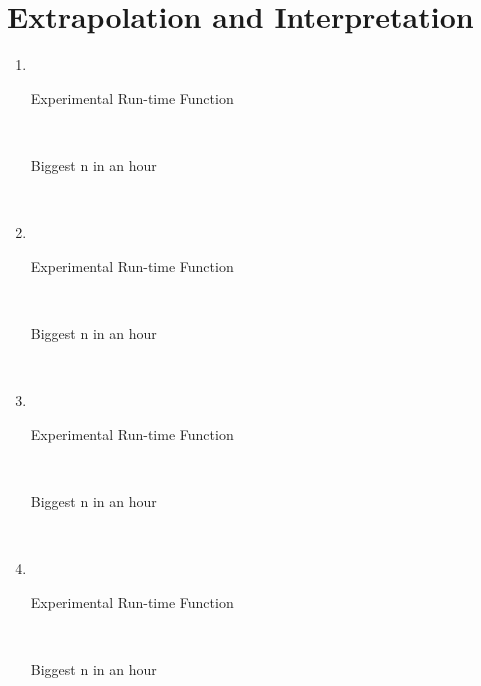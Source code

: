 \documentclass[paper=a4, fontsize=11pt]{scrartcl} %
\numberwithin{equation}{section} %
\numberwithin{figure}{section} %
\numberwithin{table}{section} %
\begin{document}
\section{Extrapolation and Interpretation}
\begin{enumerate}[label=\bfseries Algorithm \arabic*:]
    \item \hfill \\
    \begin{description}
        \item[Experimental Run-time Function] \hfill \\
        \item[Biggest n in an hour] \hfill \\
    \end{description}

    \item \hfill \\
    \begin{description}
        \item[Experimental Run-time Function] \hfill \\
        \item[Biggest n in an hour] \hfill \\
    \end{description}

    \item \hfill \\
    \begin{description}
        \item[Experimental Run-time Function] \hfill \\
        \item[Biggest n in an hour] \hfill \\
    \end{description}

    \item \hfill \\
    \begin{description}
        \item[Experimental Run-time Function] \hfill \\
        \item[Biggest n in an hour] \hfill \\
    \end{description}
\end{enumerate}
\end{document}
